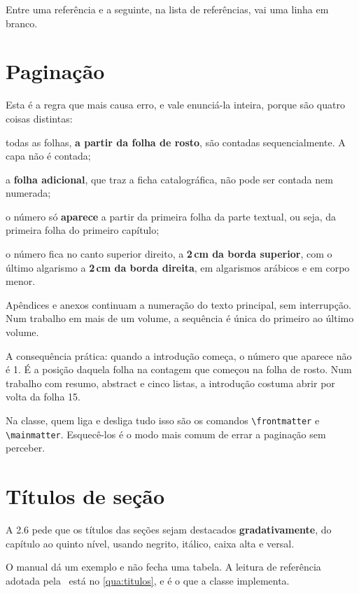 \documentclass[dsc]{ufrj}
\begin{document}
  Entre uma referência e a seguinte, na lista de referências, vai uma linha em
  branco.

  \section{Paginação}\label{sec:paginacao}

  Esta é a regra que mais causa erro, e vale enunciá-la inteira, porque são
  quatro coisas distintas:

  \begin{alineas}
    \item todas as folhas, \textbf{a partir da folha de rosto}, são contadas
      sequencialmente. A capa não é contada;
    \item a \textbf{folha adicional}, que traz a ficha catalográfica, não pode
      ser contada nem numerada;
    \item o número só \textbf{aparece} a partir da primeira folha da parte
      textual, ou seja, da primeira folha do primeiro capítulo;
    \item o número fica no canto superior direito, a \textbf{2\,cm da borda
      superior}, com o último algarismo a \textbf{2\,cm da borda direita}, em
      algarismos arábicos e em corpo menor.
  \end{alineas}

  Apêndices e anexos continuam a numeração do texto principal, sem interrupção.
  Num trabalho em mais de um volume, a sequência é única do primeiro ao último
  volume.

  A consequência prática: quando a introdução começa, o número que aparece não é
  1. É a posição daquela folha na contagem que começou na folha de rosto. Num
  trabalho com resumo, abstract e cinco listas, a introdução costuma abrir por
  volta da folha 15.

  Na classe, quem liga e desliga tudo isso são os comandos \verb|\frontmatter| e
  \verb|\mainmatter|. Esquecê-los é o modo mais comum de errar a paginação sem
  perceber.

  \section{Títulos de seção}\label{sec:titulos}

  A 2.6 pede que os títulos das seções sejam destacados \textbf{gradativamente},
  do capítulo ao quinto nível, usando negrito, itálico, caixa alta e versal.

  O manual dá um exemplo e não fecha uma tabela. A leitura de referência adotada
  pela \CoppeTeX\ está no \autoref{qua:titulos}, e é o que a classe implementa.
\end{document}
